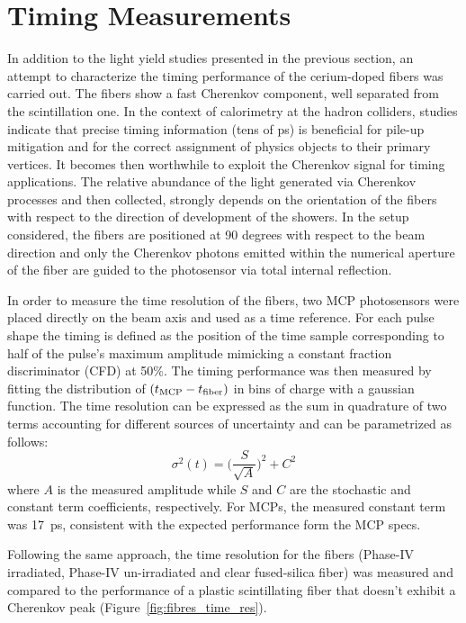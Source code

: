 \documentclass[a4paper,11pt]{article}
\begin{document}
\section{Timing Measurements}
\label{sec:timing}
In addition to the light yield studies presented in the previous section, an attempt to characterize the timing performance of the cerium-doped fibers was carried out. The fibers show a fast Cherenkov component, well separated from the scintillation one. In the context of calorimetry at the hadron colliders, studies indicate that precise timing information (tens of ps) is beneficial for pile-up mitigation and for the correct assignment of physics objects to their primary vertices. It becomes then worthwhile to exploit the Cherenkov signal for timing applications.  The relative abundance of the light generated via Cherenkov processes and then collected, strongly depends on the orientation of the fibers with respect to the direction of development of the showers. In the setup considered, the fibers are positioned at 90 degrees with respect to the beam direction and only the Cherenkov photons emitted within the numerical aperture of the fiber are guided to the photosensor via total internal reflection.

In order to measure the time resolution of the fibers, two MCP photosensors were placed directly on the beam axis and used as a time reference. For each pulse shape the timing is defined as the position of the time sample corresponding to half of the pulse's maximum amplitude mimicking a constant fraction discriminator (CFD) at 50\%. The timing performance was then measured by fitting the distribution of $(t_{\rm MCP} - t_{\rm fiber})$ in bins of charge with a gaussian function.  The time resolution can be expressed as the sum in quadrature of two terms accounting for different sources of uncertainty and can be parametrized as follows:
\begin{equation}
    \sigma^2(t) = \bigg( \frac{S}{\sqrt{A}} \bigg)^2 + C^2
\end{equation}
where $A$ is the measured amplitude while $S$ and $C$ are the stochastic and constant term coefficients, respectively. For MCPs, the measured constant term was 17~ps, consistent with the expected performance form the MCP specs.

Following the same approach, the time resolution for the fibers (Phase-IV irradiated, Phase-IV un-irradiated and clear fused-silica fiber) was measured and compared to the performance of a plastic scintillating fiber that doesn't exhibit a Cherenkov peak (Figure~\ref{fig:fibres_time_res}).
\end{document}

